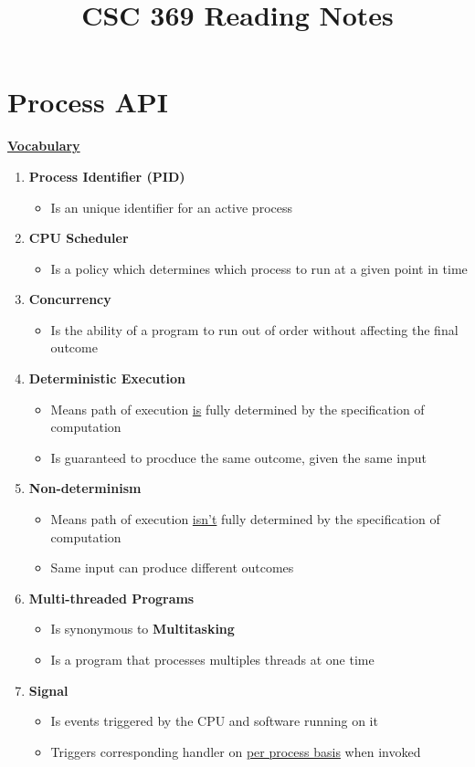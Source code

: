 \documentclass[12pt]{article}
\begin{document}
\title{CSC 369 Reading Notes}

\section{Process API}

\begin{mdframed}
\underline{\textbf{Vocabulary}}

\bigskip

\begin{enumerate}[1.]
    \item \textbf{Process Identifier (PID)}
    \begin{itemize}
        \item Is an unique identifier for an active process
    \end{itemize}
    \item \textbf{CPU Scheduler}
    \begin{itemize}
        \item Is a policy which determines which process to run at a given point in time
    \end{itemize}
    \item \textbf{Concurrency}
    \begin{itemize}
        \item Is the ability of a program to run out of order without affecting the final outcome
    \end{itemize}
    \item \textbf{Deterministic Execution}
    \begin{itemize}
        \item Means path of execution \underline{is} fully determined by the specification of computation
        \item Is guaranteed to procduce the same outcome, given the same input
    \end{itemize}
    \item \textbf{Non-determinism}
    \begin{itemize}
        \item Means path of execution \underline{isn't} fully determined by the specification of computation
        \item Same input can produce different outcomes
    \end{itemize}
    \item \textbf{Multi-threaded Programs}
    \begin{itemize}
        \item Is synonymous to \textbf{Multitasking}
        \item Is a program that processes multiples threads at one time
    \end{itemize}
    \item \textbf{Signal}
    \begin{itemize}
        \item Is events triggered by the CPU and software running on it
        \item Triggers corresponding handler on \underline{per process basis} when invoked
    \end{itemize}
\end{enumerate}


\end{mdframed}
\end{document}
